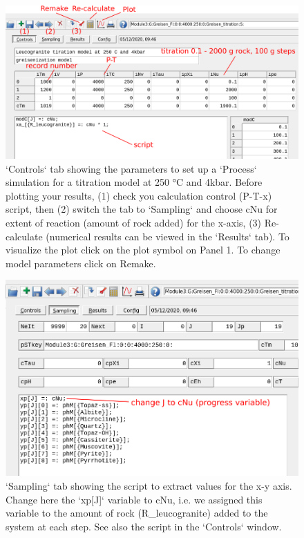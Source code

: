 \documentclass[
]{book}
\begin{document}
\begin{figure}
\includegraphics[width=1\linewidth]{figures/module3/fig-18} \caption{`Controls` tab showing the parameters to set up a `Process` simulation for a titration model at 250 °C and 4kbar. Before plotting your results, (1) check you calculation control (P-T-x) script, then (2) switch the tab to `Sampling` and choose cNu for extent of reaction (amount of rock added) for the x-axis, (3) Re-calculate (numerical results can be viewed in the `Results` tab). To visualize the plot click on the plot symbol on Panel 1. To change model parameters click on Remake.}\label{fig:fig-18c}
\end{figure}

\begin{figure}
\includegraphics[width=0.8\linewidth]{figures/module3/fig-19} \caption{`Sampling` tab showing the script to extract values for the x-y axis. Change here the `xp[J]` variable to cNu, i.e. we assigned this variable to the amount of rock (R\_leucogranite) added to the system at each step. See also the script in the `Controls` window.}\label{fig:fig-19c}
\end{figure}
\end{document}
